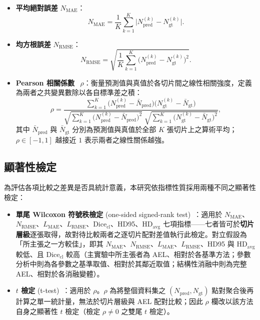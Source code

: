 \begin{itemize}
  \item \textbf{平均絕對誤差} $N_{\text{MAE}}$：
    \begin{equation}
      N_{\text{MAE}} = \frac{1}{K} \sum_{k=1}^{K} \bigl| N^{(k)}_{\text{pred}} - N^{(k)}_{\text{gt}} \bigr|.
      \label{eq:mae}
    \end{equation}
  \item \textbf{均方根誤差} $N_{\text{RMSE}}$：
    \begin{equation}
      N_{\text{RMSE}} = \sqrt{\dfrac{1}{K} \sum_{k=1}^{K} \bigl( N^{(k)}_{\text{pred}} - N^{(k)}_{\text{gt}} \bigr)^2}.
      \label{eq:rmse}
    \end{equation}
  \item \textbf{Pearson 相關係數}~\cite{pearson1896mathematical} $\rho$：衡量預測值與真值於各切片間之線性相關強度，定義為兩者之共變異數除以各自標準差之積：
    \begin{equation}
      \rho = \frac{\displaystyle\sum_{k=1}^{K} \bigl( N^{(k)}_{\text{pred}} - \bar{N}_{\text{pred}} \bigr)\bigl( N^{(k)}_{\text{gt}} - \bar{N}_{\text{gt}} \bigr)}{\sqrt{\displaystyle\sum_{k=1}^{K} \bigl( N^{(k)}_{\text{pred}} - \bar{N}_{\text{pred}} \bigr)^2}\;\sqrt{\displaystyle\sum_{k=1}^{K} \bigl( N^{(k)}_{\text{gt}} - \bar{N}_{\text{gt}} \bigr)^2}},
      \label{eq:pearson}
    \end{equation}
    其中 $\bar{N}_{\text{pred}}$ 與 $\bar{N}_{\text{gt}}$ 分別為預測值與真值於全部 $K$ 張切片上之算術平均；$\rho \in [-1, 1]$ 越接近 $1$ 表示兩者之線性關係越強。
\end{itemize}

\subsection{顯著性檢定}
\label{subsec:significance}

為評估各項比較之差異是否具統計意義，本研究依指標性質採用兩種不同之顯著性檢定：

\begin{itemize}
  \item \textbf{單尾 Wilcoxon 符號秩檢定} (one-sided signed-rank test)~\cite{wilcoxon1945individual}：適用於 $N_{\text{MAE}}$、$N_{\text{RMSE}}$、$L_{\text{MAE}}$、$L_{\text{RMSE}}$、$\text{Dice}_{\text{cl}}$、HD95、$\text{HD}_{\text{avg}}$ 七項指標——七者皆可於\textbf{切片層級}逐張取得，故對待比較兩者之逐切片配對差值執行此檢定。對立假設為「所主張之一方較佳」，即其 $N_{\text{MAE}}$、$N_{\text{RMSE}}$、$L_{\text{MAE}}$、$L_{\text{RMSE}}$、HD95 與 $\text{HD}_{\text{avg}}$ 較低、且 $\text{Dice}_{\text{cl}}$ 較高（主實驗中所主張者為 AEL、相對於各基準方法；參數分析中則為各參數之基準取值、相對於其鄰近取值；結構性消融中則為完整 AEL、相對於各消融變體）。
  \item \textbf{$t$ 檢定} (t-test)~\cite{student1908correlation}：適用於 $\rho$。$\rho$ 為將整個資料集之 $(N_{\text{pred}}, N_{\text{gt}})$ 點對聚合後再計算之單一統計量，無法於切片層級與 AEL 配對比較；因此 $\rho$ 欄改以該方法自身之顯著性 $t$ 檢定（檢定 $\rho \ne 0$ 之雙尾 $t$ 檢定）。
\end{itemize}

